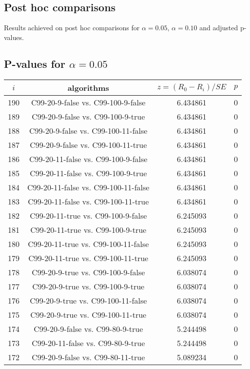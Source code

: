 \documentclass[a4paper,10pt]{article}
\begin{document}
\begin{landscape}
\pagebreak

\section{Post hoc comparisons}

Results achieved on post hoc comparisons for $\alpha = 0.05$, $\alpha = 0.10$ and adjusted p-values.

\subsection{P-values for $\alpha=0.05$}

\begin{table}[!htp]
\centering\scriptsize
\begin{tabular}{cccc}
$i$&algorithms&$z=(R_0 - R_i)/SE$&$p$\\
\hline190&C99-20-9-false vs. C99-100-9-false&6.434861&0\\
189&C99-20-9-false vs. C99-100-9-true&6.434861&0\\
188&C99-20-9-false vs. C99-100-11-false&6.434861&0\\
187&C99-20-9-false vs. C99-100-11-true&6.434861&0\\
186&C99-20-11-false vs. C99-100-9-false&6.434861&0\\
185&C99-20-11-false vs. C99-100-9-true&6.434861&0\\
184&C99-20-11-false vs. C99-100-11-false&6.434861&0\\
183&C99-20-11-false vs. C99-100-11-true&6.434861&0\\
182&C99-20-11-true vs. C99-100-9-false&6.245093&0\\
181&C99-20-11-true vs. C99-100-9-true&6.245093&0\\
180&C99-20-11-true vs. C99-100-11-false&6.245093&0\\
179&C99-20-11-true vs. C99-100-11-true&6.245093&0\\
178&C99-20-9-true vs. C99-100-9-false&6.038074&0\\
177&C99-20-9-true vs. C99-100-9-true&6.038074&0\\
176&C99-20-9-true vs. C99-100-11-false&6.038074&0\\
175&C99-20-9-true vs. C99-100-11-true&6.038074&0\\
174&C99-20-9-false vs. C99-80-9-true&5.244498&0\\
173&C99-20-11-false vs. C99-80-9-true&5.244498&0\\
172&C99-20-9-false vs. C99-80-11-true&5.089234&0\\

\end{tabular}
\end{table}
\end{landscape}
\end{document}
